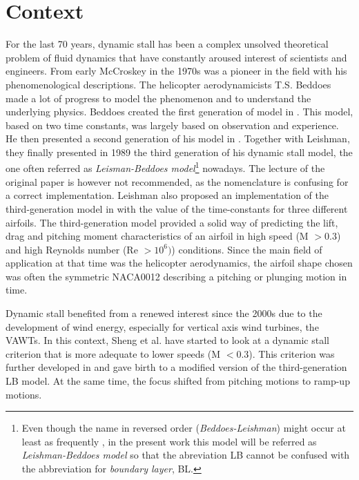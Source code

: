 \section{Context}
For the last 70 years, dynamic stall has been a complex unsolved theoretical problem of fluid dynamics that have constantly aroused interest of scientists and engineers. From early  McCroskey \cite{mccroskey_dynamic_1976} in the 1970s was a pioneer in the field with his phenomenological descriptions. The helicopter aerodynamicists T.S. Beddoes made a lot of progress to model the phenomenon and to understand the underlying physics. Beddoes created the first generation of model in \cite{beddoes_synthesis_1976}. This model, based on two time constants, was largely based on observation and experience. He then presented a second generation of his model in \cite{beddoes_representation_1983}. Together with Leishman, they finally presented in 1989 the third generation of his dynamic stall model, the one often referred as \textit{Leisman-Beddoes model}\footnote{Even though the name in reversed order (\textit{Beddoes-Leishman}) might occur at least as frequently , in the present work this model will be referred as \textit{Leishman-Beddoes model} so that the abreviation LB cannot be confused with the abbreviation for \textit{boundary layer}, BL.} nowadays. The  lecture of the original paper \cite{leishman_semi-empirical_1989} is however not recommended, as the nomenclature is confusing for a correct implementation. Leishman also proposed an implementation of the third-generation model in \cite{leishman_state-space_1989} with the value of the time-constants for three different airfoils. The third-generation model provided a solid way of predicting the lift, drag and pitching moment characteristics of an airfoil in high speed (M $>0.3$) and high Reynolds number (Re $> 10^6)$) conditions. Since the main field of application at that time was the helicopter aerodynamics, the airfoil shape chosen was often the symmetric  NACA0012 describing a pitching or plunging motion in time. 

Dynamic stall  benefited from a renewed interest since the 2000s due to the development of wind energy, especially for vertical axis wind turbines, the VAWTs. In this context, Sheng et al. have started to look at a dynamic stall criterion that is more adequate to lower speeds (M $<0.3$). This criterion was further developed in \cite{sheng_modified_2008} and gave birth to a modified version of the third-generation LB model. At the same time, the focus shifted from pitching motions to ramp-up motions. 



